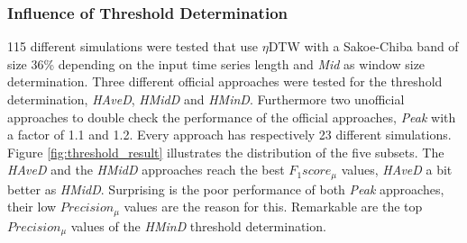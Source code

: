 \subsubsection{Influence of Threshold Determination} \label{influence_of_threshold_determination}
115 different simulations were tested that use $\eta$DTW with a Sakoe-Chiba band of size 36\% depending on the
input time series length and \textit{Mid} as window size determination. Three different official approaches were
tested for the threshold determination, \textit{HAveD}, \textit{HMidD} and \textit{HMinD}. Furthermore two unofficial
approaches to double check the performance of the official approaches, \textit{Peak} with a factor of 1.1 and 1.2. Every
approach has respectively 23 different simulations. Figure \ref{fig:threshold_result} illustrates the distribution of
the five subsets. The \textit{HAveD} and the \textit{HMidD} approaches reach the best $F_{1}score_{\mu}$ values,
\textit{HAveD} a bit better as \textit{HMidD}. Surprising is the poor performance of both \textit{Peak} approaches,
their low $Precision_{\mu}$ values are the reason for this. Remarkable are the top $Precision_{\mu}$ values of the
\textit{HMinD} threshold determination.

